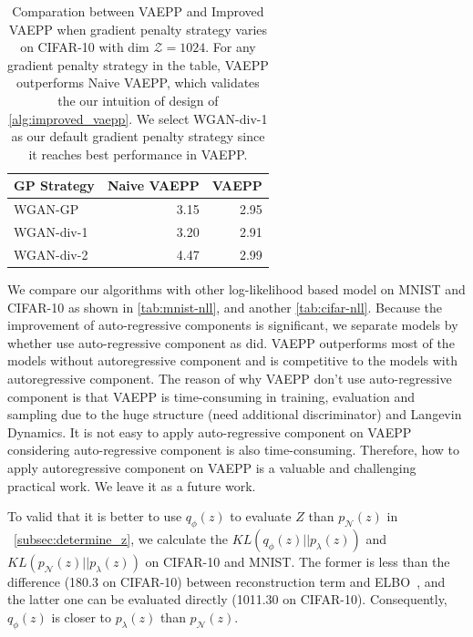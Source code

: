\begin{table}[tb]
\centering
\begin{tabular}{lrr}  
\toprule
GP Strategy  &  Naive VAEPP  & VAEPP \\
\midrule
WGAN-GP      &  3.15   & 2.95      \\
WGAN-div-1   &  3.20   & 2.91      \\
WGAN-div-2   &  4.47   & 2.99      \\
\bottomrule
\end{tabular}
\caption{Comparation between VAEPP and Improved VAEPP when gradient penalty strategy varies on CIFAR-10 with dim $\mathcal{Z} = 1024$. For any gradient penalty strategy in the table, VAEPP outperforms Naive VAEPP, which validates the our intuition of design of \cref{alg:improved_vaepp}. We select WGAN-div-1 as our default gradient penalty strategy since it reaches best performance in VAEPP. 
}
\label{tab:compare_nD_over_R}
\end{table}

We compare our algorithms with other log-likelihood based model on MNIST and CIFAR-10 as shown in \cref{tab:mnist-nll}, and another	\cref{tab:cifar-nll}. Because the improvement of auto-regressive components is significant, we separate models by whether use auto-regressive component as \cite{maaloe2019biva} did. VAEPP outperforms most of the models without autoregressive component and is competitive to the models with autoregressive component. The reason of why VAEPP don't use auto-regressive component is that VAEPP is time-consuming in training,  evaluation and sampling due to the huge structure (need additional discriminator) and Langevin Dynamics. It is not easy to apply auto-regressive component on VAEPP considering auto-regressive component is also time-consuming. 
Therefore, how to apply autoregressive component on VAEPP is a valuable and challenging practical work. We leave it as a future work.

To valid that it is better to use $q_\phi(z)$ to evaluate $Z$ than $p_\mathcal{N}(z)$ in ~\cref{subsec:determine_z}, we calculate the $KL(q_\phi(z)||p_\lambda(z))$ and $KL(p_\mathcal{N}(z)||p_\lambda(z))$ on CIFAR-10 and MNIST. The former is less than the difference (180.3 on CIFAR-10) between reconstruction term and ELBO~\cite{hoffman2016elbo}, and the latter one can be evaluated directly (1011.30 on CIFAR-10). Consequently, $q_\phi(z)$ is closer to $p_\lambda(z)$ than $p_\mathcal{N}(z)$. 

